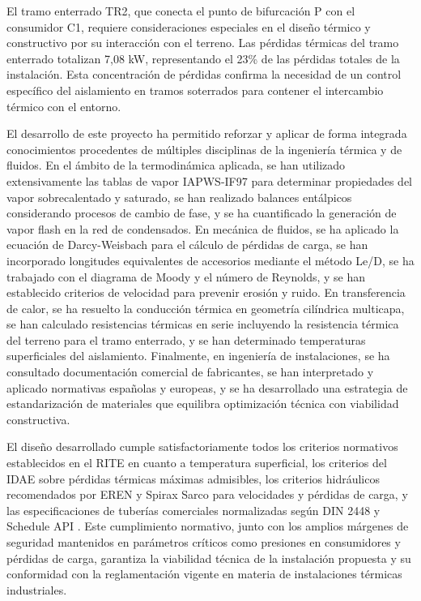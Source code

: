 \documentclass[12pt]{article}
\begin{document}
El tramo enterrado TR2, que conecta el punto de bifurcación P con el consumidor C1, requiere consideraciones especiales en el diseño térmico y constructivo por su interacción con el terreno. Las pérdidas térmicas del tramo enterrado totalizan 7,08 kW, representando el 23\% de las pérdidas totales de la instalación. Esta concentración de pérdidas confirma la necesidad de un control específico del aislamiento en tramos soterrados para contener el intercambio térmico con el entorno.

El desarrollo de este proyecto ha permitido reforzar y aplicar de forma integrada conocimientos procedentes de múltiples disciplinas de la ingeniería térmica y de fluidos. En el ámbito de la termodinámica aplicada, se han utilizado extensivamente las tablas de vapor IAPWS-IF97 para determinar propiedades del vapor sobrecalentado y saturado, se han realizado balances entálpicos considerando procesos de cambio de fase, y se ha cuantificado la generación de vapor flash en la red de condensados. En mecánica de fluidos, se ha aplicado la ecuación de Darcy-Weisbach para el cálculo de pérdidas de carga, se han incorporado longitudes equivalentes de accesorios mediante el método Le/D, se ha trabajado con el diagrama de Moody y el número de Reynolds, y se han establecido criterios de velocidad para prevenir erosión y ruido. En transferencia de calor, se ha resuelto la conducción térmica en geometría cilíndrica multicapa, se han calculado resistencias térmicas en serie incluyendo la resistencia térmica del terreno para el tramo enterrado, y se han determinado temperaturas superficiales del aislamiento. Finalmente, en ingeniería de instalaciones, se ha consultado documentación comercial de fabricantes, se han interpretado y aplicado normativas españolas y europeas, y se ha desarrollado una estrategia de estandarización de materiales que equilibra optimización técnica con viabilidad constructiva.

El diseño desarrollado cumple satisfactoriamente todos los criterios normativos establecidos en el RITE \cite{RITE2007} en cuanto a temperatura superficial, los criterios del IDAE \cite{IDAE2007} sobre pérdidas térmicas máximas admisibles, los criterios hidráulicos recomendados por EREN \cite{EREN2015} y Spirax Sarco \cite{SpiraxSarco2020} para velocidades y pérdidas de carga, y las especificaciones de tuberías comerciales normalizadas según DIN 2448 \cite{DIN2448} y Schedule API \cite{API605}. Este cumplimiento normativo, junto con los amplios márgenes de seguridad mantenidos en parámetros críticos como presiones en consumidores y pérdidas de carga, garantiza la viabilidad técnica de la instalación propuesta y su conformidad con la reglamentación vigente en materia de instalaciones térmicas industriales.
\end{document}
